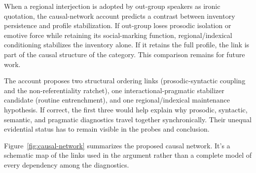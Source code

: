 \documentclass[12pt]{article}
\begin{document}
When a regional interjection is adopted by out-group speakers as ironic
quotation, the causal-network account predicts a contrast between
inventory persistence and profile stabilization. If out-group
 loses prosodic isolation or emotive force while retaining
its social-marking function, regional/indexical conditioning stabilizes
the inventory alone. If it retains the full profile, the link is part of
the causal structure of the category. This comparison remains for future
work.

The account proposes two structural ordering links
(prosodic-syntactic coupling and the non-referentiality ratchet), one
interactional-pragmatic stabilizer candidate (routine entrenchment), and
one regional/indexical maintenance hypothesis. If correct, the first three
would help explain why prosodic, syntactic, semantic, and pragmatic
diagnostics travel together synchronically. Their unequal evidential status
has to remain visible in the probes and conclusion.

Figure~\ref{fig:causal-network} summarizes the proposed causal
network. It's a schematic map of the links used in the argument rather
than a complete model of every dependency among the diagnostics.
\end{document}
